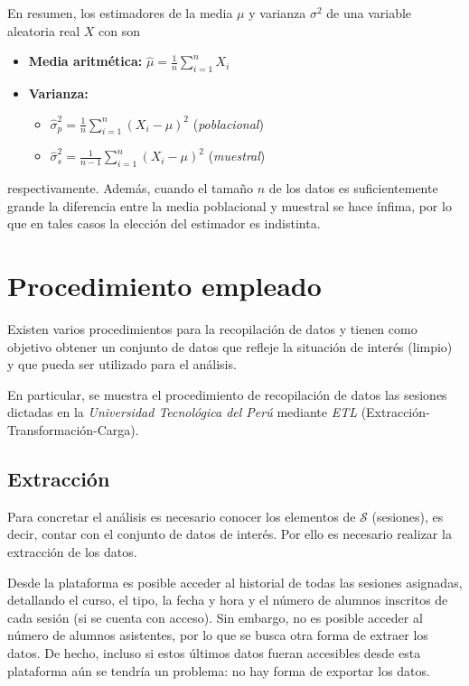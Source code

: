 \documentclass[11pt,a4paper]{book}
\theoremstyle{definition}%
\begin{document}
            En resumen, los estimadores de la media $\mu$ y varianza $\sigma^2$ de una variable aleatoria real $X$ con son
            \begin{itemize}
                \item \textbf{Media aritmética:} $\hat{\mu}=\frac{1}{n}\sum_{i=1}^n X_i$
                 \item \textbf{Varianza:}
                 \begin{itemize}
                     \item $\hat{\sigma}_p^2=\frac{1}{n}\sum_{i=1}^n (X_i-\mu)^2$ (\textit{poblacional})
                     \item $\hat{\sigma}_s^2=\frac{1}{n-1}\sum_{i=1}^n (X_i-\mu)^2$ (\textit{muestral})
                 \end{itemize}
            \end{itemize}
            respectivamente. Además, cuando el tamaño $n$ de los datos es suficientemente grande la diferencia entre la media poblacional y muestral se hace ínfima, por lo que en tales casos la elección del estimador es indistinta.
        
        \chapter{Procedimiento empleado}
            Existen varios procedimientos para la recopilación de datos y tienen como objetivo obtener un conjunto de datos que refleje la situación de interés (limpio) y que pueda ser utilizado para el análisis.
            
            En particular, se muestra el procedimiento de recopilación de datos las sesiones dictadas en la \textit{Universidad Tecnológica del Perú} mediante  \textit{ETL} (Extracción-Transformación-Carga).
            \newpage
            \section{Extracción}
                Para concretar el análisis es necesario conocer los elementos de $\mathcal{S}$ (sesiones), es decir, contar con el conjunto de datos de interés. Por ello es necesario realizar la extracción de los datos.
                
                Desde la plataforma \cite{utp:reservas} es posible acceder al historial de todas las sesiones asignadas, detallando el curso, el tipo, la  fecha y hora y el número de alumnos inscritos de cada sesión (si se cuenta con acceso). Sin embargo, no es posible acceder al número de alumnos asistentes, por lo que se busca otra forma de extraer los datos. De hecho, incluso si estos últimos datos fueran accesibles desde esta plataforma aún se tendría un problema: no hay forma de exportar los datos.
    
\end{document}
